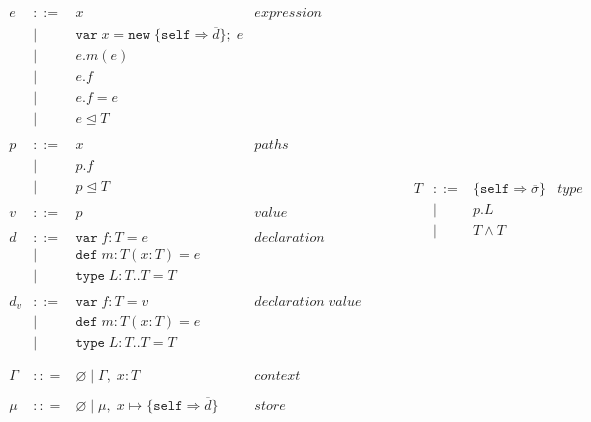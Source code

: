 \documentclass{llncs}
\begin{document}
\[
\begin{array}{lll}
\begin{array}{lllr}
e & ::= & x & expression \\
& | & \texttt{var} \; x = \texttt{new} \; \{\texttt{self} \Rightarrow \overline{d}\}; \; e&\\
& | & e.m(e) &\\
& | & e.f &\\
& | & e.f = e&\\
& | & e \unlhd T&\\
&&\\
p & ::= & x & paths \\
& | & p.f &\\
& | & p \unlhd T &\\
&&\\
v & ::= & p & value \\
&&\\
d & ::= & \texttt{var} \; f : T = e & declaration \\
  & |   & \texttt{def} \; m : T(x:T) = e &\\
  & |   & \texttt{type} \; L : T .. T = T &\\
&&\\
d_v & ::= & \texttt{var} \; f : T = v & declaration \; value \\
  & |   & \texttt{def} \; m : T(x:T) = e &\\
  & |   & \texttt{type} \; L : T .. T = T &\\
&&\\
&&\\
\Gamma & :: = & \varnothing \; | \; \Gamma, \; x : T & context \\
&&\\
\mu & :: = & \varnothing \; | \; \mu,\; x \mapsto \{\texttt{self} \Rightarrow \overline{d}\} & store \\
\end{array}
& ~~~~~~
&
\begin{array}{lllr}
T & ::= & \{\texttt{self} \Rightarrow \overline{\sigma}\} & type \\
& | & p.L &\\
& | & T \wedge T & \\

\end{array}
\end{array}\]
\end{document}
